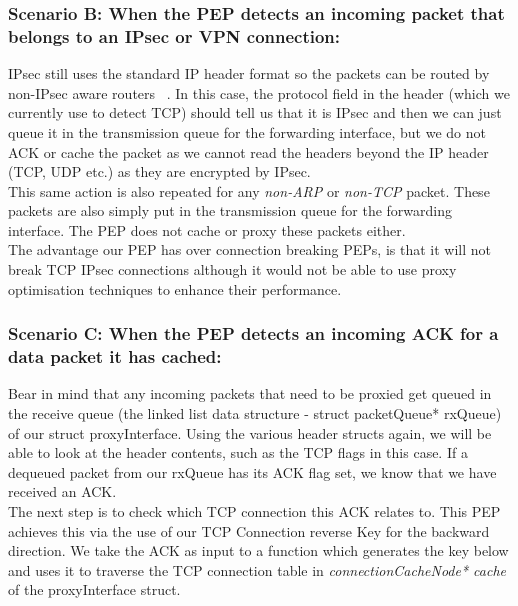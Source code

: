 \subsubsection{Scenario B: When the PEP detects an incoming packet that belongs to an IPsec or VPN connection:}

IPsec still uses the standard IP header format so the packets can be routed by non-IPsec aware routers ~\cite{13}. In this case, the protocol field in the header (which we currently use to detect TCP) should tell us that it is IPsec and then we can just queue it in the transmission queue for the forwarding interface, but we do not ACK or cache the packet as we cannot read the headers beyond the IP header (TCP, UDP etc.) as they are encrypted by IPsec. \\

This same action is also repeated for any \emph{non-ARP} or \emph{non-TCP} packet. These packets are also simply put in the transmission queue for the forwarding interface. The PEP does not cache or proxy these packets either.\\

The advantage our PEP has over connection breaking PEPs, is that it will not break TCP IPsec connections although it would not be able to use proxy optimisation techniques to enhance their performance.

\subsubsection{Scenario C: When the PEP detects an incoming ACK for a data packet it has cached:}

Bear in mind that any incoming packets that need to be proxied get queued in the receive queue (the linked list data structure - struct packetQueue* rxQueue) of our struct proxyInterface. Using the various header structs again, we will be able to look at the header contents, such as the TCP flags in this case. If a dequeued packet from our rxQueue has its ACK flag set, we know that we have received an ACK. \\

The next step is to check which TCP connection this ACK relates to. This PEP achieves this via the use of our TCP Connection reverse Key for the backward direction. We take the ACK as input to a function which generates the key below and uses it to traverse the TCP connection table in \emph{connectionCacheNode* cache} of the proxyInterface struct. \\

